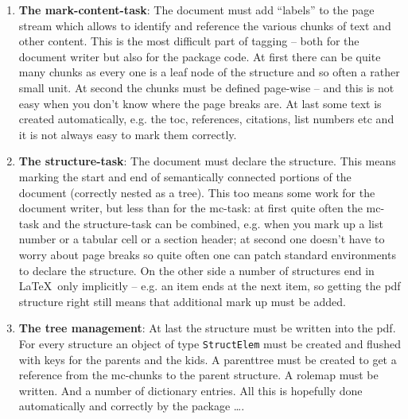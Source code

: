 \documentclass[DIV=12,parskip=half-,bibliography=totoc]{scrartcl}
\begin{document}
\begin{enumerate}
\item \textbf{The mark-content-task}: The document must add \enquote{labels} to the page stream which allows to identify and reference the various chunks of text and other content.  This is the most difficult part of tagging -- both for the document writer but also for the package code. At first there can be quite many chunks as every one is a leaf node of the structure and so often a rather small unit.  At second the chunks must be defined page-wise -- and this is not easy when you don't know where the page breaks are. At last some text is created automatically, e.g. the toc, references, citations, list numbers etc and it is not always easy to mark them correctly.

\item \textbf{The structure-task}:  The document must declare the structure. This means marking the start and end of semantically connected portions of the document (correctly nested as a tree). This too means some work for the document writer, but less than for the mc-task: at first quite often the mc-task and the structure-task can be combined, e.g. when you mark up a list number or a tabular cell or a section header; at second one doesn't have to worry about page breaks so quite often one can patch standard environments to declare the structure. On the other side a number of structures end in \LaTeX\ only implicitly -- e.g. an item ends at the next item, so getting the pdf structure right still means that additional mark up must be added.

\item \textbf{The tree management}: At last the structure must be written into the pdf. For every structure an object of type \texttt{StructElem} must be  created and flushed with keys for the parents and the kids. A parenttree must be created to get a reference from the mc-chunks to the parent structure. A rolemap must be written. And a number of dictionary entries. All this is hopefully done automatically and correctly by the package \ldots.
\end{enumerate}
\end{document}
